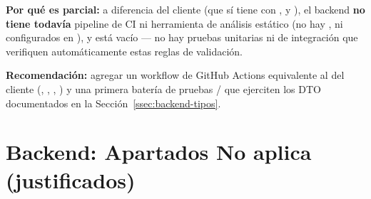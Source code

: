 \documentclass[11pt,a4paper]{article}
\begin{document}
\textbf{Por qué es parcial:} a diferencia del cliente (que sí tiene \texttt{} con \texttt{}, \texttt{} y \texttt{}), el backend \textbf{no tiene todavía} pipeline de CI ni herramienta de análisis estático (no hay \texttt{}, \texttt{} ni \texttt{} configurados en \texttt{}), y \texttt{} está vacío --- no hay pruebas unitarias ni de integración que verifiquen automáticamente estas reglas de validación.

\textbf{Recomendación:} agregar un workflow de GitHub Actions equivalente al del cliente (\texttt{}, \texttt{}, \texttt{}, \texttt{}) y una primera batería de pruebas \texttt{}/\texttt{} que ejerciten los DTO documentados en la Sección~\ref{ssec:backend-tipos}.

\section{Backend: Apartados No aplica (justificados)}
\label{sec:backend-noaplica}
\end{document}
